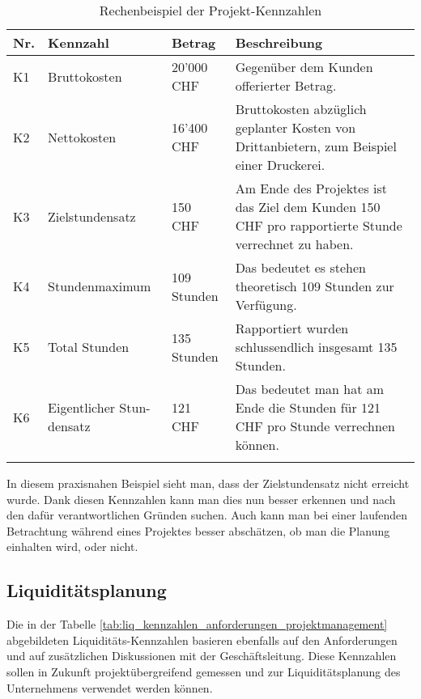 \begin{longtable}{lp{3cm}p{3cm}p{7cm}}
    \toprule \textbf{Nr.} & \textbf{Kennzahl} & \textbf{Betrag} & \textbf{Beschreibung} \\
    \midrule K1 & Bruttokosten & 20'000 CHF & 
        Gegenüber dem Kunden offerierter Betrag. \\
    \midrule K2 & Nettokosten & 16'400 CHF &
        Bruttokosten abzüglich geplanter Kosten von Drittanbietern, zum
        Beispiel einer Druckerei.\\
    \midrule K3 & Zielstundensatz & 150 CHF & 
        Am Ende des Projektes ist das Ziel dem Kunden 150 CHF pro rapportierte
        Stunde verrechnet zu haben. \\
    \midrule K4 & Stundenmaximum & 109 Stunden & 
        Das bedeutet es stehen theoretisch 109 Stunden zur Verfügung. \\
    \midrule K5 & Total Stunden & 135 Stunden & 
        Rapportiert wurden schlussendlich insgesamt 135 Stunden. \\
    \midrule K6 & Eigentlicher Stun- densatz & 121 CHF & 
        Das bedeutet man hat am Ende die Stunden für 121 CHF pro Stunde
        verrechnen können. \\
    \bottomrule
    \caption[Rechenbeispiel der Projekt-Kennzahlen]{Rechenbeispiel der 
        Projekt-Kennzahlen\footnotemark}
    \label{tab:proj_kennzahlen_anforderungen_projektmanagement_bsp}
\end{longtable}

In diesem praxisnahen Beispiel sieht man, dass der Zielstundensatz nicht erreicht
wurde. Dank diesen Kennzahlen kann man dies nun besser erkennen und nach den 
dafür verantwortlichen Gründen suchen. Auch kann man bei einer laufenden 
Betrachtung während eines Projektes besser abschätzen, ob man die Planung
einhalten wird, oder nicht.

\subsection{Liquiditätsplanung}
Die in der Tabelle \ref{tab:liq_kennzahlen_anforderungen_projektmanagement} abgebildeten
Liquiditäts-Kennzahlen basieren ebenfalls auf den Anforderungen und auf zusätzlichen
Diskussionen mit der Geschäftsleitung. Diese Kennzahlen sollen in Zukunft
projektübergreifend gemessen und zur Liquiditätsplanung des Unternehmens
verwendet werden können.

